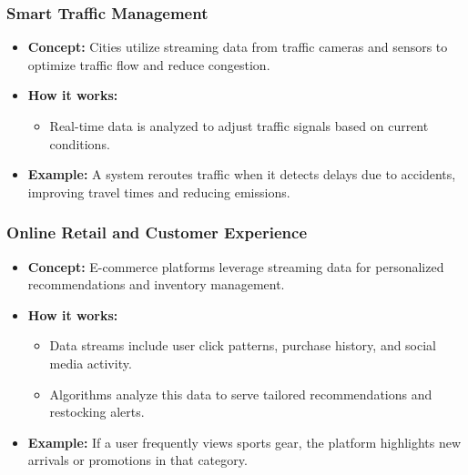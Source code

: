\documentclass[aspectratio=169]{beamer}
\begin{document}
\begin{frame}[fragile]
    \frametitle{Smart Traffic Management}
    \begin{itemize}
        \item \textbf{Concept:} 
        Cities utilize streaming data from traffic cameras and sensors to optimize traffic flow and reduce congestion.
        
        \item \textbf{How it works:} 
        \begin{itemize}
            \item Real-time data is analyzed to adjust traffic signals based on current conditions.
        \end{itemize}
        
        \item \textbf{Example:} 
        A system reroutes traffic when it detects delays due to accidents, improving travel times and reducing emissions.
    \end{itemize}
\end{frame}

\begin{frame}[fragile]
    \frametitle{Online Retail and Customer Experience}
    \begin{itemize}
        \item \textbf{Concept:} 
        E-commerce platforms leverage streaming data for personalized recommendations and inventory management.
        
        \item \textbf{How it works:} 
        \begin{itemize}
            \item Data streams include user click patterns, purchase history, and social media activity.
            \item Algorithms analyze this data to serve tailored recommendations and restocking alerts.
        \end{itemize}
        
        \item \textbf{Example:} 
        If a user frequently views sports gear, the platform highlights new arrivals or promotions in that category.
    \end{itemize}
\end{frame}
\end{document}
